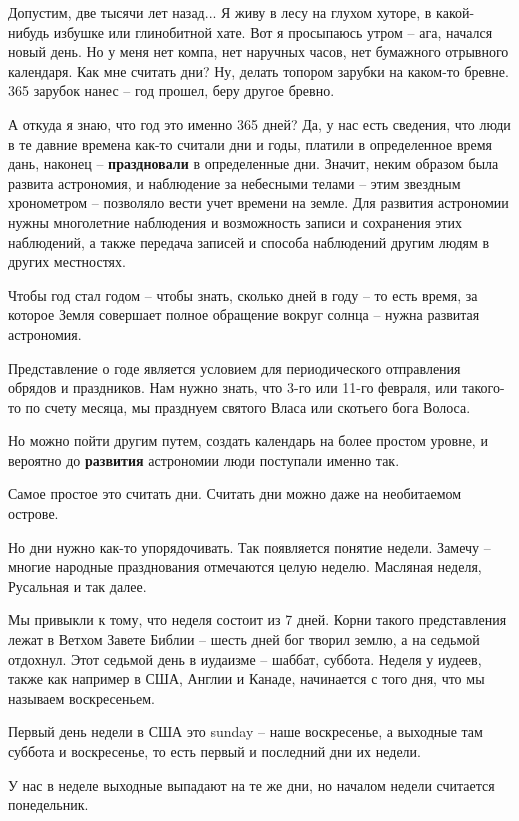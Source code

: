    Допустим, две тысячи лет назад... Я живу в лесу на глухом хуторе, в какой-нибудь избушке или глинобитной хате. Вот я просыпаюсь утром – ага, начался новый день. Но у меня нет компа, нет наручных часов, нет бумажного отрывного календаря. Как мне считать дни? Ну, делать топором зарубки на каком-то бревне. 365 зарубок нанес – год прошел, беру другое бревно.

   А откуда я знаю, что год это именно 365 дней? Да, у нас есть сведения, что люди в те давние времена как-то считали дни и годы, платили в определенное время дань, наконец – \textbf{праздновали} в определенные дни. Значит, неким образом была развита астрономия, и наблюдение за небесными телами – этим звездным хронометром – позволяло вести учет времени на земле. Для развития астрономии нужны многолетние наблюдения и возможность записи и сохранения этих наблюдений, а также передача записей и способа наблюдений другим людям в других местностях.

   Чтобы год стал годом – чтобы знать, сколько дней в году – то есть время, за которое Земля совершает полное обращение вокруг солнца – нужна развитая астрономия. 

   Представление о годе является условием для периодического отправления обрядов и праздников. Нам нужно знать, что 3-го или 11-го февраля, или такого-то по счету месяца, мы празднуем святого Власа или скотьего бога Волоса.

   Но можно пойти другим путем, создать календарь на более простом уровне, и вероятно до \textbf{развития} астрономии люди поступали именно так.

   Самое простое это считать дни. Считать дни можно даже на необитаемом острове.

   Но дни нужно как-то упорядочивать. Так появляется понятие недели. Замечу – многие народные празднования отмечаются целую неделю. Масляная неделя, Русальная и так далее.

Мы привыкли к тому, что неделя состоит из 7 дней. Корни такого представления лежат в Ветхом Завете Библии – шесть дней бог творил землю, а на седьмой отдохнул. Этот седьмой день в иудаизме – шаббат, суббота. Неделя у иудеев, также как например в США, Англии и Канаде, начинается с того дня, что мы называем воскресеньем. 

Первый день недели в США это sunday – наше воскресенье, а выходные там суббота и воскресенье, то есть первый и последний дни их недели.

У нас в неделе выходные выпадают на те же дни, но началом недели считается понедельник.

